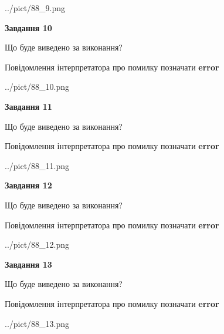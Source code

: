 \documentclass[11pt, ukrainian]{article}
\begin{document}
{\begin {large}
\begin{center}
	{../pict/88_9.png}
\end{center}
\newpage

{\begin {center}\textbf{Завдання 10}\end {center}}\par
Що буде виведено за виконання? \par
Повідомлення інтерпретатора про помилку позначати \textbf{error}

\begin{center}
	{../pict/88_10.png}
\end{center}
\newpage

{\begin {center}\textbf{Завдання 11}\end {center}}\par
Що буде виведено за виконання? \par
Повідомлення інтерпретатора про помилку позначати \textbf{error}

\begin{center}
	{../pict/88_11.png}
\end{center}
\newpage

{\begin {center}\textbf{Завдання 12}\end {center}}\par
Що буде виведено за виконання? \par
Повідомлення інтерпретатора про помилку позначати \textbf{error}

\begin{center}
	{../pict/88_12.png}
\end{center}
\newpage

{\begin {center}\textbf{Завдання 13}\end {center}}\par
Що буде виведено за виконання? \par
Повідомлення інтерпретатора про помилку позначати \textbf{error}

\begin{center}
	{../pict/88_13.png}
\end{center}
\newpage


\end{large}}
\end{document}
